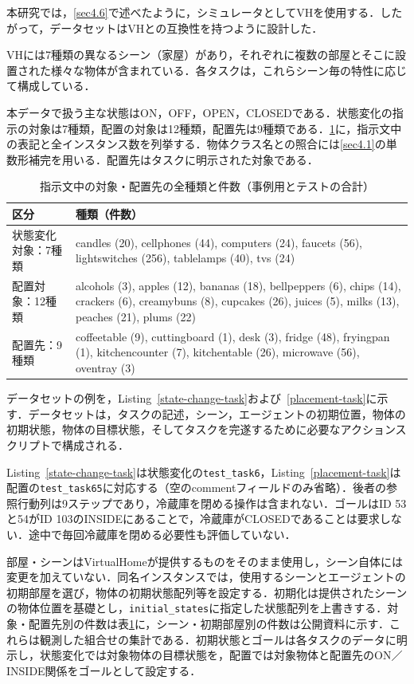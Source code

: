 本研究では，\ref{sec4.6}で述べたように，シミュレータとしてVHを使用する．したがって，データセットはVHとの互換性を持つように設計した．

VHには7種類の異なるシーン（家屋）があり，それぞれに複数の部屋とそこに設置された様々な物体が含まれている．各タスクは，これらシーン毎の特性に応じて構成している．

本データで扱う主な状態はON，OFF，OPEN，CLOSEDである．状態変化の指示の対象は7種類，配置の対象は12種類，配置先は9種類である．\ref{tab:dataset_classes}に，指示文中の表記と全インスタンス数を列挙する．物体クラス名との照合には\ref{sec4.1}の単数形補完を用いる．配置先はタスクに明示された対象である．

\begin{table}[tb]
\caption{指示文中の対象・配置先の全種類と件数（事例用とテストの合計）}\label{tab:dataset_classes}
\centering\small
\begin{tabular}{p{}p{}}
\hline
区分 & 種類（件数） \\
\hline
状態変化対象：7種類 & candles (20), cellphones (44), computers (24), faucets (56), lightswitches (256), tablelamps (40), tvs (24) \\
配置対象：12種類 & alcohols (3), apples (12), bananas (18), bellpeppers (6), chips (14), crackers (6), creamybuns (8), cupcakes (26), juices (5), milks (13), peaches (21), plums (22) \\
配置先：9種類 & coffeetable (9), cuttingboard (1), desk (3), fridge (48), fryingpan (1), kitchencounter (7), kitchentable (26), microwave (56), oventray (3) \\
\hline
\end{tabular}
\end{table}

データセットの例を，Listing~\ref{state-change-task}および~\ref{placement-task}に示す．データセットは，タスクの記述，シーン，エージェントの初期位置，物体の初期状態，物体の目標状態，そしてタスクを完遂するために必要なアクションスクリプトで構成される．

Listing~\ref{state-change-task}は状態変化の\texttt{test\_task6}，Listing~\ref{placement-task}は配置の\texttt{test\_task65}に対応する（空のcommentフィールドのみ省略）．後者の参照行動列は9ステップであり，冷蔵庫を閉める操作は含まれない．ゴールはID 53と54がID 103のINSIDEにあることで，冷蔵庫がCLOSEDであることは要求しない．途中で毎回冷蔵庫を閉める必要性も評価していない．

部屋・シーンはVirtualHomeが提供するものをそのまま使用し，シーン自体には変更を加えていない．同名インスタンスでは，使用するシーンとエージェントの初期部屋を選び，物体の初期状態配列等を設定する．初期化は提供されたシーンの物体位置を基礎とし，\texttt{initial\_states}に指定した状態配列を上書きする．対象・配置先別の件数は表\ref{tab:dataset_classes}に，シーン・初期部屋別の件数は公開資料に示す．これらは観測した組合せの集計である．初期状態とゴールは各タスクのデータに明示し，状態変化では対象物体の目標状態を，配置では対象物体と配置先のON／INSIDE関係をゴールとして設定する．

